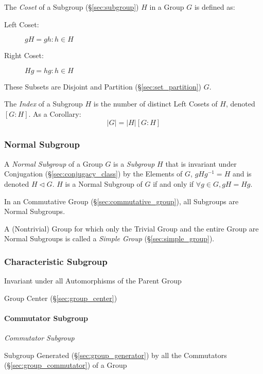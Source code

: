 The \emph{Coset} of a Subgroup (\S\ref{sec:subgroup}) $H$ in a Group
$G$ is defined as:
\begin{description}
\item[Left Coset:] $gH = {gh : h \in H}$
\item[Right Coset:] $Hg = {hg : h \in H}$
\end{description}
These Subsets are Disjoint and Partition (\S\ref{sec:set_partition}) $G$.

The \emph{Index} of a Subgroup $H$ is the number of distinct Left
Cosets of $H$, denoted $[G:H]$. As a Corollary:
\[
    |G| = |H|[G:H]
\]



\subsubsection{Normal Subgroup}\label{sec:normal_subgroup}

A \emph{Normal Subgroup} of a Group $G$ is a \emph{Subgroup} $H$ that is
invariant under Conjugation (\S\ref{sec:conjugacy_class}) by the Elements of
$G$, $gHg^{-1} = H$ and is denoted $H \triangleleft G$. $H$ is a Normal Subgroup
of $G$ if and only if $\forall g \in G, gH = Hg$.

In an Commutative Group (\S\ref{sec:commutative_group}), all Subgroups are
Normal Subgroups.

A (Nontrivial) Group for which only the Trivial Group and the entire Group are
Normal Subgroups is called a \emph{Simple Group} (\S\ref{sec:simple_group}).



\subsubsection{Characteristic Subgroup}\label{sec:characteristic_subgroup}

Invariant under all Automorphisms of the Parent Group

Group Center (\S\ref{sec:group_center})



\paragraph{Commutator Subgroup}\label{sec:commutator_subgroup}\hfill

\emph{Commutator Subgroup}

Subgroup Generated (\S\ref{sec:group_generator}) by all the
Commutators (\S\ref{sec:group_commutator}) of a Group



